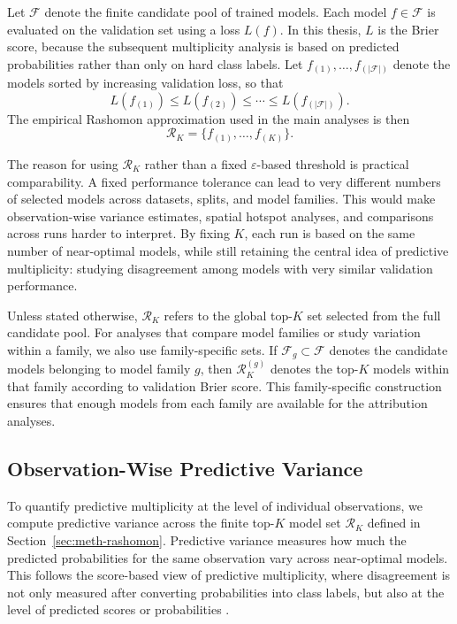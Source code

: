 Let $\mathcal{F}$ denote the finite candidate pool of trained models. Each model
$f \in \mathcal{F}$ is evaluated on the validation set using a loss $L(f)$.
In this thesis, $L$ is the Brier score, because the subsequent multiplicity
analysis is based on predicted probabilities rather than only on hard class labels. Let
$f_{(1)}, \ldots, f_{(|\mathcal{F}|)}$ denote the models sorted by increasing validation
loss, so that
\[
L(f_{(1)}) \leq L(f_{(2)}) \leq \cdots
\leq L(f_{(|\mathcal{F}|)}).
\]
The empirical Rashomon approximation used in the main analyses is then
\[
\mathcal{R}_K = \{f_{(1)}, \ldots, f_{(K)}\}.
\]

The reason for using $\mathcal{R}_K$ rather than a fixed $\varepsilon$-based threshold is
practical comparability. A fixed performance tolerance can lead to very different numbers
of selected models across datasets, splits, and model families. This would make
observation-wise variance estimates, spatial hotspot analyses, and comparisons across
runs harder to interpret. By fixing $K$, each run is based on the same number of
near-optimal models, while still retaining the central idea of predictive multiplicity:
studying disagreement among models with very similar validation performance.

Unless stated otherwise, $\mathcal{R}_K$ refers to the global top-$K$ set selected from
the full candidate pool. For analyses that compare model families or study variation
within a family, we also use family-specific sets. If $\mathcal{F}_g \subset \mathcal{F}$
denotes the candidate models belonging to model family $g$, then
$\mathcal{R}^{(g)}_K$ denotes the top-$K$ models within that family according to
validation Brier score. This family-specific construction ensures that enough models from
each family are available for the attribution analyses.

\subsection{Observation-Wise Predictive Variance}
\label{sec:meth-metrics}

To quantify predictive multiplicity at the level of individual observations, we compute
predictive variance across the finite top-$K$ model set $\mathcal{R}_K$ defined in
Section~\ref{sec:meth-rashomon}. Predictive variance measures how much the predicted
probabilities for the same observation vary across near-optimal models. This follows the
score-based view of predictive multiplicity, where disagreement is not only measured
after converting probabilities into class labels, but also at the level of predicted scores or
probabilities \citep{watson-daniels_predictive_2023, hsu_rashomon_nodate}.

